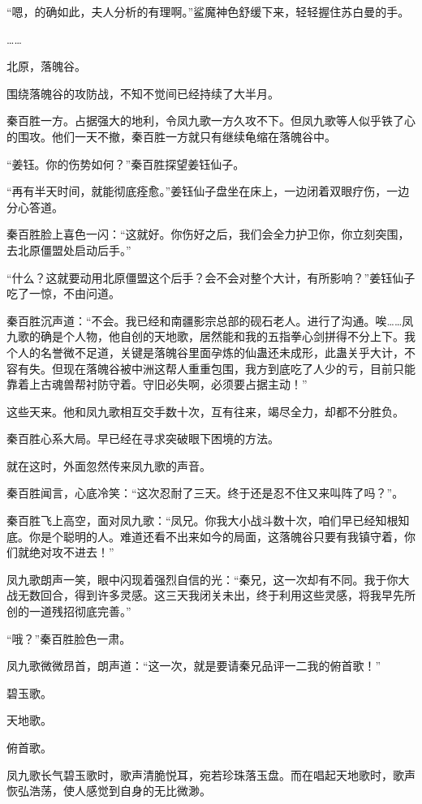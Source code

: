 \begin{this_body}
“嗯，的确如此，夫人分析的有理啊。”鲨魔神色舒缓下来，轻轻握住苏白曼的手。

……

北原，落魄谷。

围绕落魄谷的攻防战，不知不觉间已经持续了大半月。

秦百胜一方。占据强大的地利，令凤九歌一方久攻不下。但凤九歌等人似乎铁了心的围攻。他们一天不撤，秦百胜一方就只有继续龟缩在落魄谷中。

“姜钰。你的伤势如何？”秦百胜探望姜钰仙子。

“再有半天时间，就能彻底痊愈。”姜钰仙子盘坐在床上，一边闭着双眼疗伤，一边分心答道。

秦百胜脸上喜色一闪：“这就好。你伤好之后，我们会全力护卫你，你立刻突围，去北原僵盟处启动后手。”

“什么？这就要动用北原僵盟这个后手？会不会对整个大计，有所影响？”姜钰仙子吃了一惊，不由问道。

秦百胜沉声道：“不会。我已经和南疆影宗总部的砚石老人。进行了沟通。唉……凤九歌的确是个人物，他自创的天地歌，居然能和我的五指拳心剑拼得不分上下。我个人的名誉微不足道，关键是落魄谷里面孕炼的仙蛊还未成形，此蛊关乎大计，不容有失。但现在落魄谷被中洲这帮人重重包围，我方到底吃了人少的亏，目前只能靠着上古魂兽帮衬防守着。守旧必失啊，必须要占据主动！”

这些天来。他和凤九歌相互交手数十次，互有往来，竭尽全力，却都不分胜负。

秦百胜心系大局。早已经在寻求突破眼下困境的方法。

就在这时，外面忽然传来凤九歌的声音。

秦百胜闻言，心底冷笑：“这次忍耐了三天。终于还是忍不住又来叫阵了吗？”。

秦百胜飞上高空，面对凤九歌：“凤兄。你我大小战斗数十次，咱们早已经知根知底。你是个聪明的人。难道还看不出来如今的局面，这落魄谷只要有我镇守着，你们就绝对攻不进去！”

凤九歌朗声一笑，眼中闪现着强烈自信的光：“秦兄，这一次却有不同。我于你大战无数回合，得到许多灵感。这三天我闭关未出，终于利用这些灵感，将我早先所创的一道残招彻底完善。”

“哦？”秦百胜脸色一肃。

凤九歌微微昂首，朗声道：“这一次，就是要请秦兄品评一二我的俯首歌！”

碧玉歌。

天地歌。

俯首歌。

凤九歌长气碧玉歌时，歌声清脆悦耳，宛若珍珠落玉盘。而在唱起天地歌时，歌声恢弘浩荡，使人感觉到自身的无比微渺。


\end{this_body}
